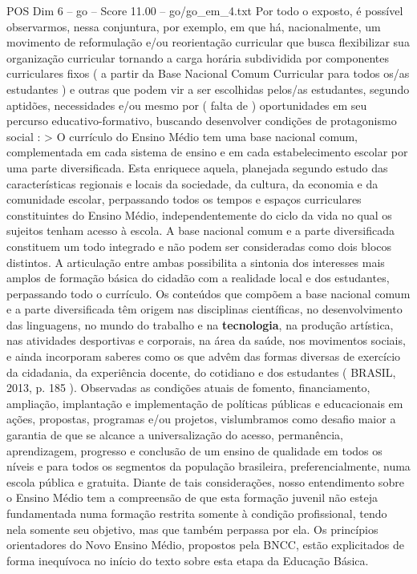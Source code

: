 \begin{textsample}{POS Dim 6 – go – Score 11.00 – go/go\_em\_4.txt}
Por todo o exposto, é possível observarmos, nessa conjuntura, por exemplo, em que há, nacionalmente, um movimento de reformulação e/ou reorientação curricular que busca flexibilizar sua organização curricular tornando a carga horária subdividida por componentes curriculares fixos ( a partir da Base Nacional Comum Curricular para todos os/as estudantes ) e outras que podem vir a ser escolhidas pelos/as estudantes, segundo aptidões, necessidades e/ou mesmo por ( falta de ) oportunidades em seu percurso educativo-formativo, buscando desenvolver condições de protagonismo social : > O currículo do Ensino Médio tem uma base nacional comum, complementada em cada sistema de ensino e em cada estabelecimento escolar por uma parte diversificada.
Esta enriquece aquela, planejada segundo estudo das características regionais e locais da sociedade, da cultura, da economia e da comunidade escolar, perpassando todos os tempos e espaços curriculares constituintes do Ensino Médio, independentemente do ciclo da vida no qual os sujeitos tenham acesso à escola.
A base nacional comum e a parte diversificada constituem um todo integrado e não podem ser consideradas como dois blocos distintos.
A articulação entre ambas possibilita a sintonia dos interesses mais amplos de formação básica do cidadão com a realidade local e dos estudantes, perpassando todo o currículo.
Os conteúdos que compõem a base nacional comum e a parte diversificada têm origem nas disciplinas científicas, no desenvolvimento das linguagens, no mundo do trabalho e na \textbf{tecnologia}, na produção artística, nas atividades desportivas e corporais, na área da saúde, nos movimentos sociais, e ainda incorporam saberes como os que advêm das formas diversas de exercício da cidadania, da experiência docente, do cotidiano e dos estudantes ( BRASIL, 2013, p. 185 ).
Observadas as condições atuais de fomento, financiamento, ampliação, implantação e implementação de políticas públicas e educacionais em ações, propostas, programas e/ou projetos, vislumbramos como desafio maior a garantia de que se alcance a universalização do acesso, permanência, aprendizagem, progresso e conclusão de um ensino de qualidade em todos os níveis e para todos os segmentos da população brasileira, preferencialmente, numa escola pública e gratuita.
Diante de tais considerações, nosso entendimento sobre o Ensino Médio tem a compreensão de que esta formação juvenil não esteja fundamentada numa formação restrita somente à condição profissional, tendo nela somente seu objetivo, mas que também perpassa por ela.
Os princípios orientadores do Novo Ensino Médio, propostos pela BNCC, estão explicitados de forma inequívoca no início do texto sobre esta etapa da Educação Básica.

\end{textsample}
